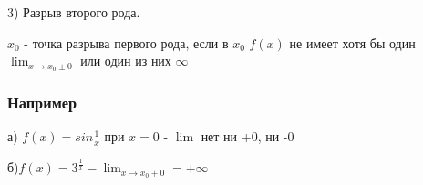 3) Разрыв второго рода.

\opred
$x_0$ - точка разрыва первого рода, если в $x_0$ $f(x)$ не имеет хотя бы один $\lim_{x \to x_0 \pm  0}$ или один из них $\infty$

\subsubsection{Например}
а) $f(x) = sin \frac {1}{x}$ при $x=0$ - $\lim$ нет ни +0, ни -0

б)$f(x) = 3^\frac{1}{x} - \lim_{x \to x_0 + 0} = +\infty$